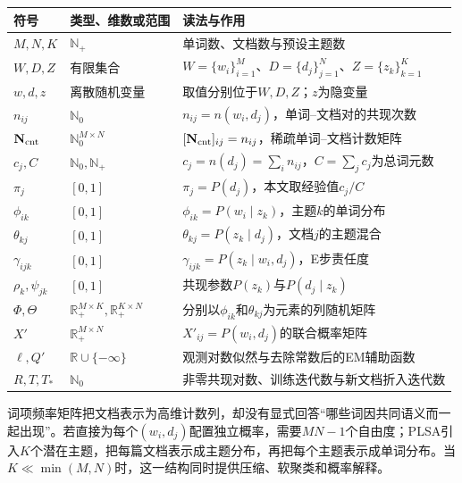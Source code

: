 \begin{symboltablebox}
\small
\begin{tabularx}{\linewidth}{@{}l l X@{}}
\toprule 符号 & 类型、维数或范围 & 读法与作用\\ \midrule
$M,N,K$ & $\mathbb N_+$ & 单词数、文档数与预设主题数\\
$W,D,Z$ & 有限集合 & $W=\{w_i\}_{i=1}^M$、$D=\{d_j\}_{j=1}^N$、$Z=\{z_k\}_{k=1}^K$\\
$w,d,z$ & 离散随机变量 & 取值分别位于$W,D,Z$；$z$为隐变量\\
$n_{ij}$ & $\mathbb N_0$ & $n_{ij}=n(w_i,d_j)$，单词--文档对的共现次数\\
$\mathbf N_{\rm cnt}$ & $\mathbb N_0^{M\times N}$ & $[\mathbf N_{\rm cnt}]_{ij}=n_{ij}$，稀疏单词--文档计数矩阵\\
$c_j,C$ & $\mathbb N_0,\mathbb N_+$ & $c_j=n(d_j)=\sum_i n_{ij}$，$C=\sum_jc_j$为总词元数\\
$\pi_j$ & $[0,1]$ & $\pi_j=P(d_j)$，本文取经验值$c_j/C$\\
$\phi_{ik}$ & $[0,1]$ & $\phi_{ik}=P(w_i\mid z_k)$，主题$k$的单词分布\\
$\theta_{kj}$ & $[0,1]$ & $\theta_{kj}=P(z_k\mid d_j)$，文档$j$的主题混合\\
$\gamma_{ijk}$ & $[0,1]$ & $\gamma_{ijk}=P(z_k\mid w_i,d_j)$，E步责任度\\
$\rho_k,\psi_{jk}$ & $[0,1]$ & 共现参数$P(z_k)$与$P(d_j\mid z_k)$\\
$\Phi,\Theta$ & $\mathbb R_+^{M\times K},\mathbb R_+^{K\times N}$ & 分别以$\phi_{ik}$和$\theta_{kj}$为元素的列随机矩阵\\
$X'$ & $\mathbb R_+^{M\times N}$ & $X'_{ij}=P(w_i,d_j)$的联合概率矩阵\\
$\ell,Q'$ & $\mathbb R\cup\{-\infty\}$ & 观测对数似然与去除常数后的EM辅助函数\\
$R,T,T_*$ & $\mathbb N_0$ & 非零共现对数、训练迭代数与新文档折入迭代数\\
\bottomrule
\end{tabularx}
\end{symboltablebox}

\label{struct:V4-C06-CH06}
词项频率矩阵把文档表示为高维计数列，却没有显式回答“哪些词因共同语义而一起出现”。若直接为每个$(w_i,d_j)$配置独立概率，需要$MN-1$个自由度；PLSA引入$K$个潜在主题，把每篇文档表示成主题分布，再把每个主题表示成单词分布。当$K\ll\min(M,N)$时，这一结构同时提供压缩、软聚类和概率解释。

